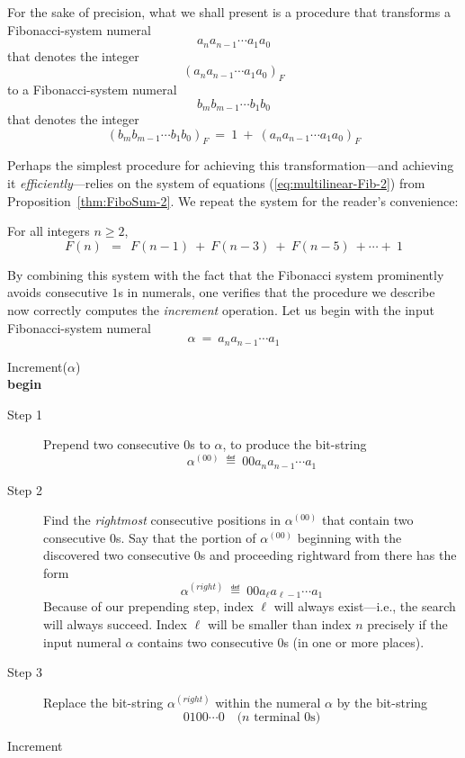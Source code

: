 
\smallskip

\noindent
For the sake of precision, what we shall present is a procedure that transforms a Fibonacci-system numeral
\[ a_n a_{n-1} \cdots a_1 a_0 \]
that denotes the integer
\[ (a_n a_{n-1} \cdots a_1 a_0)_F \]
to a Fibonacci-system numeral
\[ b_m b_{m-1} \cdots b_1 b_0 \]
that denotes the integer
\[ (b_m b_{m-1} \cdots b_1 b_0)_F \ = \ 1 \ + \ (a_n a_{n-1} \cdots a_1 a_0)_F \]

Perhaps the simplest procedure for achieving this transformation---and achieving it {\em efficiently}---relies on the system of equations (\ref{eq:multilinear-Fib-2}) from Proposition~\ref{thm:FiboSum-2}.  We repeat the system for the reader's convenience:

\medskip

\noindent For all integers $n \geq 2$,
\[ F(n) \ \ = \ \ F(n-1) \ + \ F(n-3) \ + \ F(n-5) \ + \cdots + \ 1 \]

\medskip

By combining this system with the fact that the Fibonacci system prominently avoids consecutive $1$s in numerals, one verifies that the procedure we describe now correctly computes the {\em increment} operation.  Let us begin with the input Fibonacci-system numeral
\[ \alpha \ = \  a_n a_{n-1} \cdots a_1 \]

\bigskip

 {\sf Increment}($\alpha$) \\
{\bf begin}
\begin{description}
\item[{\sf Step} 1]
Prepend two consecutive $0$s to $\alpha$, to produce the bit-string
\[  \alpha^{(00)} \ \eqdef \  0 0 a_n a_{n-1} \cdots a_1 \]

\item[{\sf Step} 2]
Find the {\em rightmost} consecutive positions in $\alpha^{(00)}$ that contain two consecutive $0$s.  Say that the portion of $\alpha^{(00)}$ beginning with the discovered two consecutive $0$s and proceeding rightward from there has the form
\[  \alpha^{(right)} \ \eqdef \  0 0 a_\ell a_{\ell-1} \cdots a_1 \]
Because of our prepending step, index $\ell$ will always exist---i.e., the search will always succeed.   Index $\ell$ will be smaller than index $n$ precisely if the input numeral $\alpha$ contains two consecutive $0$s (in one or more places).

\item[{\sf Step} 3]
Replace the bit-string $\alpha^{(right)}$ within the numeral $\alpha$ by the bit-string
\[ 0 1 0 0 \cdots 0 \ \ \ \mbox{ ($n$ terminal $0$s)} \]
\end{description}
 {\sf Increment}

